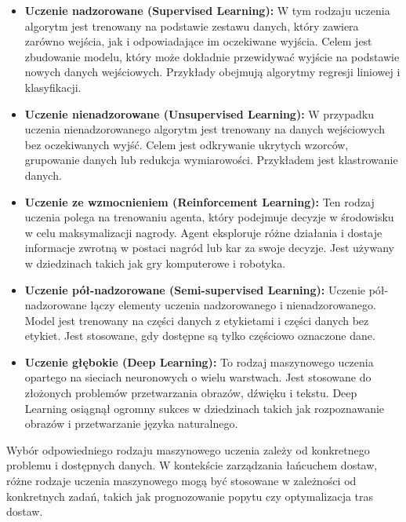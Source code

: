 \begin{itemize}
    \item \textbf{Uczenie nadzorowane (Supervised Learning):} W tym rodzaju uczenia algorytm jest trenowany na podstawie zestawu danych, który zawiera zarówno wejścia, jak i odpowiadające im oczekiwane wyjścia. Celem jest zbudowanie modelu, który może dokładnie przewidywać wyjście na podstawie nowych danych wejściowych. Przykłady obejmują algorytmy regresji liniowej i klasyfikacji.

    \item \textbf{Uczenie nienadzorowane (Unsupervised Learning):} W przypadku uczenia nienadzorowanego algorytm jest trenowany na danych wejściowych bez oczekiwanych wyjść. Celem jest odkrywanie ukrytych wzorców, grupowanie danych lub redukcja wymiarowości. Przykładem jest klastrowanie danych.

    \item \textbf{Uczenie ze wzmocnieniem (Reinforcement Learning):} Ten rodzaj uczenia polega na trenowaniu agenta, który podejmuje decyzje w środowisku w celu maksymalizacji nagrody. Agent eksploruje różne działania i dostaje informacje zwrotną w postaci nagród lub kar za swoje decyzje. Jest używany w dziedzinach takich jak gry komputerowe i robotyka.

    \item \textbf{Uczenie pół-nadzorowane (Semi-supervised Learning):} Uczenie pół-nadzorowane łączy elementy uczenia nadzorowanego i nienadzorowanego. Model jest trenowany na części danych z etykietami i części danych bez etykiet. Jest stosowane, gdy dostępne są tylko częściowo oznaczone dane.

    \item \textbf{Uczenie głębokie (Deep Learning):} To rodzaj maszynowego uczenia opartego na sieciach neuronowych o wielu warstwach. Jest stosowane do złożonych problemów przetwarzania obrazów, dźwięku i tekstu. Deep Learning osiągnął ogromny sukces w dziedzinach takich jak rozpoznawanie obrazów i przetwarzanie języka naturalnego.

\end{itemize}

Wybór odpowiedniego rodzaju maszynowego uczenia zależy od konkretnego problemu i dostępnych danych. W kontekście zarządzania łańcuchem dostaw, różne rodzaje uczenia maszynowego mogą być stosowane w zależności od konkretnych zadań, takich jak prognozowanie popytu czy optymalizacja tras dostaw.



